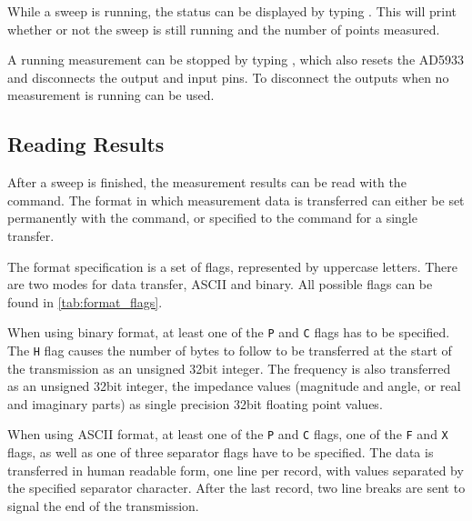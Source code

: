 While a sweep is running, the status can be displayed by typing . This will print whether or not
the sweep is still running and the number of points measured.

A running measurement can be stopped by typing , which also resets the AD5933 and disconnects the
output and input pins. To disconnect the outputs when no measurement is running  can be used.

\subsection{Reading Results}

After a sweep is finished, the measurement results can be read with the  command.
The format in which measurement data is transferred can either be set permanently with the
 command, or specified to the  command for a single transfer.

The format specification is a set of flags, represented by uppercase letters. There are two modes for data transfer,
ASCII and binary. All possible flags can be found in \autoref{tab:format_flags}.

When using binary format, at least one of the \texttt{P} and \texttt{C} flags has to be specified. The \texttt{H} flag
causes the number of bytes to follow to be transferred at the start of the transmission as an unsigned \unit{32}{bit}
integer. The frequency is also transferred as an unsigned \unit{32}{bit} integer, the impedance values (magnitude and
angle, or real and imaginary parts) as single precision \unit{32}{bit} floating point values.

When using ASCII format, at least one of the \texttt{P} and \texttt{C} flags, one of the \texttt{F} and \texttt{X}
flags, as well as one of three separator flags have to be specified. The data is transferred in human readable form,
one line per record, with values separated by the specified separator character. After the last record, two line breaks
are sent to signal the end of the transmission.

